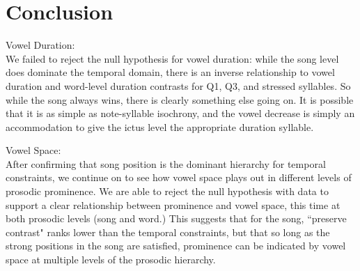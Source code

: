 \documentclass[12pt]{article}
\begin{document}

\section*{Conclusion}

Vowel Duration: \\
We failed to reject the null hypothesis for vowel duration: while the song level does dominate the temporal domain, there is an inverse relationship to vowel duration and word-level duration contrasts for Q1, Q3, and stressed syllables. So while the song always wins, there is clearly something else going on. It is possible that it is as simple as note-syllable isochrony, and the vowel decrease is simply an accommodation to give the ictus level the appropriate duration syllable. 

Vowel Space: \\

After confirming that song position is the dominant hierarchy for temporal constraints, we continue on to see how vowel space plays out in different levels of prosodic prominence. We are able to reject the null hypothesis with data to support a clear relationship between prominence and vowel space, this time at both prosodic levels (song and word.) This suggests that for the song, ``preserve contrast" ranks lower than the temporal constraints, but that so long as the strong positions in the song are satisfied, prominence can be indicated by vowel space at multiple levels of the prosodic hierarchy.  





\end{document}
